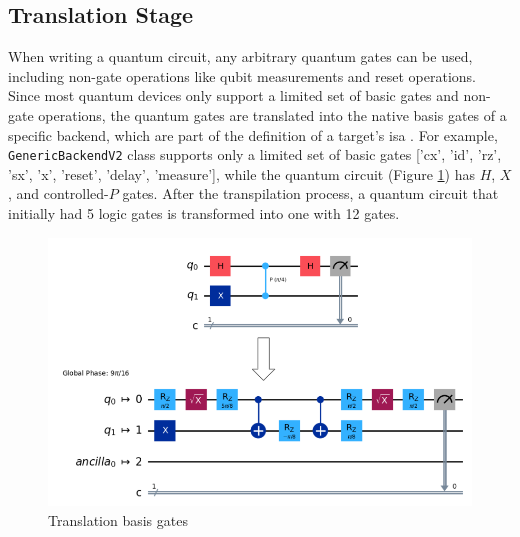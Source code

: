 \subsection{Translation Stage} %
When writing a quantum circuit, any arbitrary quantum gates can be used, including non-gate operations like qubit measurements and reset operations. Since most quantum devices only support a limited set of basic gates and non-gate operations, the quantum gates are translated into the native basis gates of a specific backend, which are part of the definition of a target's \acrshort{isa} \cite{gokhale_faster_2021}. For example, \lstinline{GenericBackendV2} class supports only a limited set of basic gates ['cx', 'id', 'rz', 'sx', 'x', 'reset', 'delay', 'measure'], while the quantum circuit (Figure \ref{fig:translation}) has $H$, $X$, and controlled-$P$ gates. After the transpilation process, a quantum circuit that initially had 5 logic gates is transformed into one with 12 gates.
\begin{figure}[htb]
    \centering
    \includegraphics[width=0.7\linewidth]{image/translation_basis_gates.png}
    \caption{Translation basis gates}
    \label{fig:translation}
\end{figure}